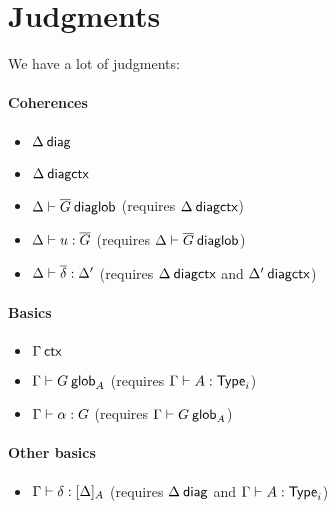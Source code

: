 \newcommand\diagbase[0]{\ensuremath{\mathord{*}}}

\section{Judgments}

We have a lot of judgments:

\paragraph{Coherences}

\begin{itemize}
\item $\Delta \: \mathsf{diag}$
\item ${\Delta} \: \mathsf{diagctx}$
\item ${\Delta} \vdash {\ensuremath{\overline{G}}} \: \mathsf{diaglob}$ (requires ${\Delta} \: \mathsf{diagctx}$)
\item ${\Delta} \vdash {u} : {\overline{G}}$ (requires ${\Delta} \vdash {\ensuremath{\overline{G}}} \: \mathsf{diaglob}$)
\item ${\Delta} \vdash {\ensuremath{\overline{\delta}}} : {\Delta'}$ (requires ${\Delta} \: \mathsf{diagctx}$
  and ${\Delta'} \: \mathsf{diagctx}$)
\end{itemize}

\paragraph{Basics}

\begin{itemize}
\item ${\Gamma} \: \mathsf{ctx}$
\item ${\Gamma} \vdash {G} \: \mathsf{glob}_{A}$ (requires ${\Gamma} \vdash {A} : {\mathsf{Type}_{i}}$)
\item ${\Gamma} \vdash {\alpha} : {G}$ (requires ${\Gamma} \vdash {G} \: \mathsf{glob}_{A}$)
\end{itemize}

\paragraph{Other basics}

\begin{itemize}
\item ${\Gamma} \vdash {\delta} : {[ \Delta ]_{A}}$ (requires $\Delta \: \mathsf{diag}$ and
  ${\Gamma} \vdash {A} : {\mathsf{Type}_{i}}$)
\end{itemize}


